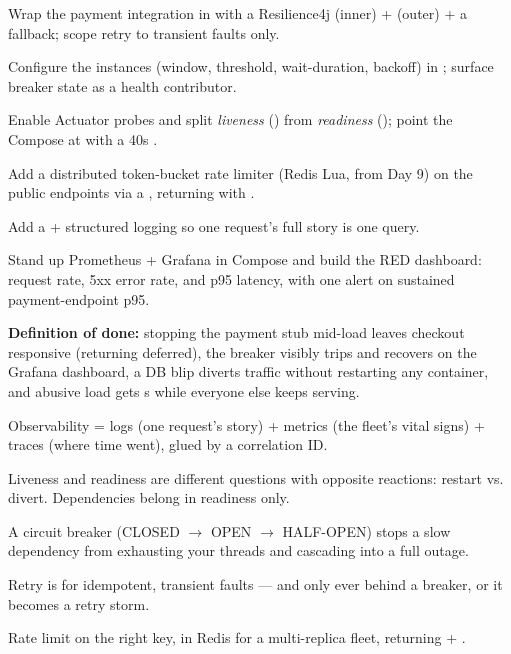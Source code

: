 \begin{buildalong}
\begin{wbitem}
  \item Wrap the payment integration in  with a Resilience4j  (inner) +  (outer) + a  fallback; scope retry to transient faults only.
  \item Configure the  instances (window, threshold, wait-duration, backoff) in ; surface breaker state as a health contributor.
  \item Enable Actuator probes and split \emph{liveness} () from \emph{readiness} (); point the Compose  at  with a 40s .
  \item Add a distributed token-bucket rate limiter (Redis Lua, from Day 9) on the public endpoints via a , returning  with .
  \item Add a  + structured logging so one request's full story is one query.
  \item Stand up Prometheus + Grafana in Compose and build the RED dashboard: request rate, 5xx error rate, and p95 latency, with one alert on sustained payment-endpoint p95.
\end{wbitem}
\smallskip\textbf{Definition of done:} stopping the payment stub mid-load leaves checkout responsive (returning deferred), the breaker visibly trips and recovers on the Grafana dashboard, a DB blip diverts traffic without restarting any container, and abusive load gets s while everyone else keeps serving.
\end{buildalong}


\begin{tickcheck}
  \item Observability = logs (one request's story) + metrics (the fleet's vital signs) + traces (where time went), glued by a correlation ID.
  \item Liveness and readiness are different questions with opposite reactions: restart vs. divert. Dependencies belong in readiness only.
  \item A circuit breaker (CLOSED $\rightarrow$ OPEN $\rightarrow$ HALF-OPEN) stops a slow dependency from exhausting your threads and cascading into a full outage.
  \item Retry is for idempotent, transient faults --- and only ever behind a breaker, or it becomes a retry storm.
  \item Rate limit on the right key, in Redis for a multi-replica fleet, returning  + .
\end{tickcheck}

